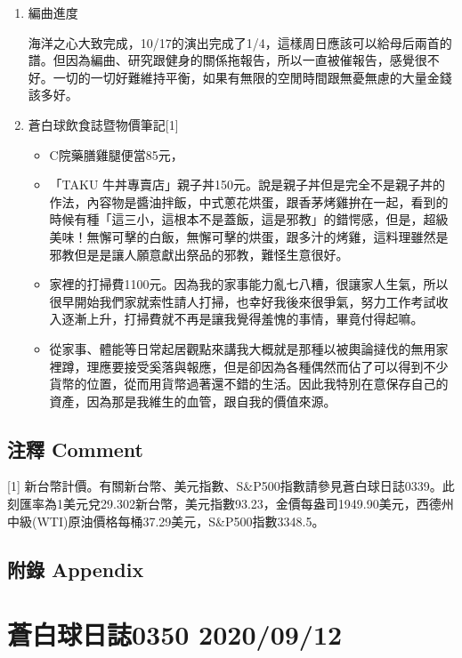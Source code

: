 \documentclass[
]{article}
\providecommand{\tightlist}{%
  \setlength{\itemsep}{0pt}\setlength{\parskip}{0pt}}
\begin{document}
\begin{enumerate}
\def\labelenumi{\arabic{enumi}.}
\item
  編曲進度

  海洋之心大致完成，10/17的演出完成了1/4，這樣周日應該可以給母后兩首的譜。但因為編曲、研究跟健身的關係拖報告，所以一直被催報告，感覺很不好。一切的一切好難維持平衡，如果有無限的空閒時間跟無憂無慮的大量金錢該多好。
\item
  蒼白球飲食誌暨物價筆記{[}1{]}

  \begin{itemize}
  \tightlist
  \item
    C院藥膳雞腿便當85元，
  \item
    「TAKU
    牛丼專賣店」親子丼150元。說是親子丼但是完全不是親子丼的作法，內容物是醬油拌飯，中式蔥花烘蛋，跟香茅烤雞拚在一起，看到的時候有種「這三小，這根本不是蓋飯，這是邪教」的錯愕感，但是，超級美味！無懈可擊的白飯，無懈可擊的烘蛋，跟多汁的烤雞，這料理雖然是邪教但是是讓人願意獻出祭品的邪教，難怪生意很好。
  \item
    家裡的打掃費1100元。因為我的家事能力亂七八糟，很讓家人生氣，所以很早開始我們家就索性請人打掃，也幸好我後來很爭氣，努力工作考試收入逐漸上升，打掃費就不再是讓我覺得羞愧的事情，畢竟付得起嘛。
  \item
    從家事、體能等日常起居觀點來講我大概就是那種以被輿論撻伐的無用家裡蹲，理應要接受奚落與報應，但是卻因為各種偶然而佔了可以得到不少貨幣的位置，從而用貨幣過著還不錯的生活。因此我特別在意保存自己的資產，因為那是我維生的血管，跟自我的價值來源。
  \end{itemize}
\end{enumerate}

\hypertarget{ux6ce8ux91cb-comment-10}{%
\subsection{注釋 Comment}\label{ux6ce8ux91cb-comment-10}}

{[}1{]}
新台幣計價。有關新台幣、美元指數、S\&P500指數請參見蒼白球日誌0339。此刻匯率為1美元兌29.302新台幣，美元指數93.23，金價每盎司1949.90美元，西德州中級(WTI)原油價格每桶37.29美元，S\&P500指數3348.5。

\hypertarget{ux9644ux9304-appendix-10}{%
\subsection{附錄 Appendix}\label{ux9644ux9304-appendix-10}}

\hypertarget{ux84bcux767dux7403ux65e5ux8a8c0350-20200912}{%
\section{蒼白球日誌0350
2020/09/12}\label{ux84bcux767dux7403ux65e5ux8a8c0350-20200912}}
\end{document}
